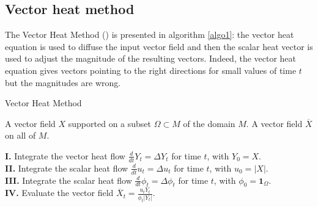 \documentclass[sigconf]{acmart}
\begin{document}
\subsection{Vector heat method}
The Vector Heat Method (\cite{Sharp:2019:VHM}) is presented in algorithm \ref{algo1}: the vector heat equation is used to diffuse the input vector field and then the scalar heat vector is used to adjust the magnitude of the resulting vectors. Indeed, the vector heat equation gives vectors pointing to the right directions for small values of time $t$ but the magnitudes are wrong. 

\begin{algorithm}
\caption{Vector Heat Method} \label{algo1}
\begin{algorithmic}
\Require A vector field $X$ supported on a subset $\Omega \subset M$ of the domain $M$.
\Ensure A vector field $\overline{X}$ on all of $M$.

\noindent \textbf{I.} Integrate the vector heat flow $\frac{d}{dt} Y_t = \Delta Y_t$ for time $t$, with $Y_0 = X$. \\

\textbf{II.} Integrate the scalar heat flow $\frac{d}{dt} u_t = \Delta u_t$ for time $t$, with $u_0 = |X|$. \\

\textbf{III.} Integrate the scalar heat flow $\frac{d}{dt} \phi_t = \Delta \phi_t$ for time $t$, with $\phi_0 = \mathbf{1}_{\Omega}$. \\

\textbf{IV.} Evaluate the vector field $\overline{X}_t = \frac{u_t Y_t}{\phi_t |Y_t|}$.
\end{algorithmic}
\end{algorithm}
\end{document}
